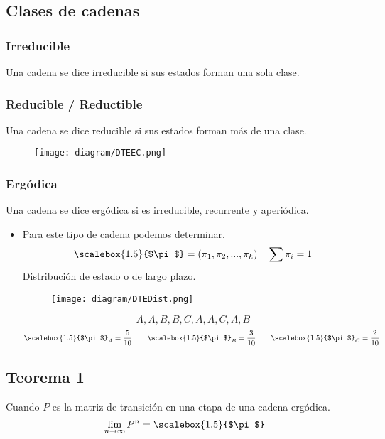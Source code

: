 \documentclass{templateNote}
\begin{document}
\newpage
\subsection{Clases de cadenas}
\subsubsection{Irreducible}
Una cadena se dice irreducible si sus estados forman una sola clase.
\subsubsection{Reducible / Reductible}
Una cadena se dice reducible si sus estados forman m\'as de una clase.
\begin{figure}[H]
    \centering
    \texttt{[image: diagram/DTEEC.png]}
\end{figure}
\subsubsection{Erg\'odica}
Una cadena se dice erg\'odica si es irreducible, recurrente y aperi\'odica.
\begin{itemize}
    \item Para este tipo de cadena podemos determinar.
    \begin{equation*}
        \scalebox{1.5}{$\pi$} = \left(\pi_1, \pi_2, ..., \pi_k\right) \quad \sum{\pi_i} = 1
    \end{equation*}
    Distribución de estado o de largo plazo.
    \begin{figure}[H]
        \centering
        \texttt{[image: diagram/DTEDist.png]}
    \end{figure}
    \begin{equation*}
        A, A, B, B, C, A, A, C, A, B
    \end{equation*}
    \begin{equation*}
        \scalebox{1.5}{$\pi$}_A = \frac{5}{10} \qquad \scalebox{1.5}{$\pi$}_B = \frac{3}{10} \qquad \scalebox{1.5}{$\pi$}_C = \frac{2}{10}
    \end{equation*}
\end{itemize}

\subsection{Teorema 1}
Cuando $P$ es la matriz de transición en una etapa de una cadena ergódica.
\begin{equation*}
    \lim_{n \to \infty}{P^n} = \scalebox{1.5}{$\pi$}
\end{equation*}
\end{document}
